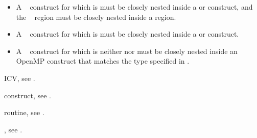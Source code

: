 \restrictions
\begin{itemize}
\item A ~ construct for which 
       is  must be closely nested
      inside a  or  construct, and the ~ region 
      must be closely nested inside a  region. 
\item A ~ construct for which 
       is  must be closely nested inside 
      a  or  construct.
\item A ~ construct for which 
       is neither  nor 
      must be closely nested inside an OpenMP construct that matches the type 
      specified in .
\end{itemize}

\begin{samepage}
\begin{crossrefs}
\item {} ICV, see
.

\item {} construct, see
.

\item {} routine, see
.

\item {}, see .

\end{crossrefs}
\end{samepage}
